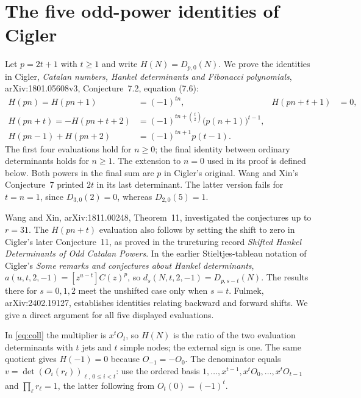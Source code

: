 \documentclass[11pt,a4paper]{article}
\begin{document}
\section{The five odd-power identities of Cigler}
Let $p=2t+1$ with $t\ge1$ and write $H(N)=D_{p,0}(N)$.
We prove the identities in Cigler, \emph{Catalan numbers, Hankel determinants
and Fibonacci polynomials}, arXiv:1801.05608v3, Conjecture~7.2, equation (7.6):
\begin{align*}
 H(pn)=H(pn+1)&=(-1)^{tn},&
 H(pn+t+1)&=0,\\
 H(pn+t)=-H(pn+t+2)&=(-1)^{tn+\binom t2}\big(p(n+1)\big)^{t-1},\\
 H(pn-1)+H(pn+2)&=(-1)^{tn+1}p(t-1).
\end{align*}
The first four evaluations hold for $n\ge0$; the final identity between ordinary determinants holds for $n\ge1$. The extension to $n=0$ used in its proof is defined below. Both powers in the final sum are $p$ in Cigler's original. Wang and Xin's Conjecture~7 printed $2t$ in its last determinant. The latter version fails for $t=n=1$, since $D_{3,0}(2)=0$, whereas $D_{2,0}(5)=1$.

Wang and Xin, arXiv:1811.00248, Theorem~11, investigated the conjectures up to $r=31$. The $H(pn+t)$ evaluation also follows by setting the shift to zero in Cigler's later Conjecture~11, as proved in the trureturing record \emph{Shifted Hankel Determinants of Odd Catalan Powers}. In the earlier Stieltjes-tableau notation of Cigler's \emph{Some remarks and conjectures about Hankel determinants}, $a(u,t,2,-1)=[z^{u-t}]C(z)^p$, so $d_s(N,t,2,-1)=D_{p,s-t}(N)$. The results there for $s=0,1,2$ meet the unshifted case only when $s=t$. Fulmek, arXiv:2402.19127, establishes identities relating backward and forward shifts. We give a direct argument for all five displayed evaluations.

In \eqref{eq:coll} the multiplier is $x^t O_t$, so $H(N)$ is the ratio of the two evaluation determinants with $t$ jets and $t$ simple nodes; the external sign is one. The same quotient gives $H(-1)=0$ because $O_{-1}=-O_0$. The denominator equals $v=\det(O_i(r_\ell))_{\ell,\,0\le i<t}$: use the ordered basis $1,\ldots,x^{t-1},x^tO_0,\ldots,x^tO_{t-1}$ and $\prod_\ell r_\ell=1$, the latter following from $O_t(0)=(-1)^t$.
\end{document}

